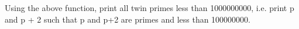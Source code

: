Using the above function, print all twin primes less than 1000000000, i.e. print p and p + 2 such that p and p+2 are primes and less than 100000000.

